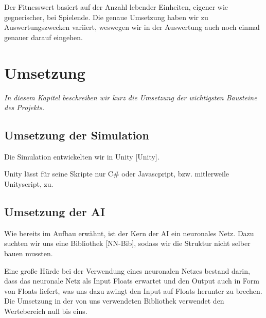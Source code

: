 \documentclass[
	12pt,
	a4paper,
	BCOR10mm,
	DIV14,
	headsepline,
	usegeometry,
]{scrreprt}
\begin{document}
Der Fitnesswert basiert auf der Anzahl lebender Einheiten, eigener wie gegnerischer, bei Spielende.
Die genaue Umsetzung haben wir zu Auswertungszwecken variiert, weswegen wir in der Auswertung auch noch einmal genauer darauf eingehen.

\chapter{Umsetzung}
\label{Umsetzung}

\textit{%
In diesem Kapitel beschreiben wir kurz die Umsetzung der wichtigsten Bausteine des Projekts.
}

\bigskip

\section{Umsetzung der Simulation}

Die Simulation entwickelten wir in Unity [Unity].

Unity lässt für seine Skripte nur C\# oder Javascpript, bzw. mitlerweile Unityscript, zu.


\section{Umsetzung der AI}
Wie bereits im Aufbau erwähnt, ist der Kern der AI ein neuronales Netz.
Dazu suchten wir uns eine Bibliothek [NN-Bib], sodass wir die Struktur nicht selber bauen mussten.

Eine große Hürde bei der Verwendung eines neuronalen Netzes bestand darin, dass das neuronale Netz als Input Floats erwartet und den Output auch in Form von Floats liefert, was uns dazu zwingt den Input auf Floats herunter zu brechen.
Die Umsetzung in der von uns verwendeten Bibliothek verwendet den Wertebereich null bis eins.
\end{document}
